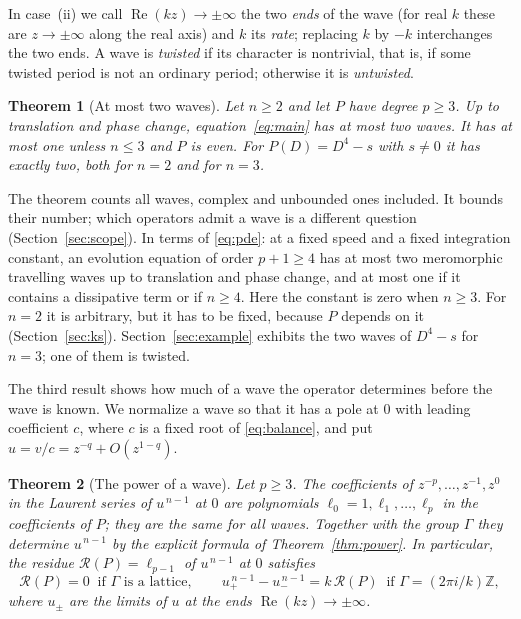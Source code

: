 \documentclass[11pt]{article}
\newtheorem{mainthm}{Theorem}
\theoremstyle{definition}
\theoremstyle{remark}
\numberwithin{equation}{section}
\newcommand{\ZZ}{\mathbb Z}
\begin{document}
In case~(ii) we call \(\operatorname{Re}(kz)\to\pm\infty\) the two
\emph{ends} of the wave (for real \(k\) these are \(z\to\pm\infty\) along
the real axis) and \(k\) its \emph{rate}; replacing \(k\) by \(-k\)
interchanges the two ends. A wave is \emph{twisted} if its character
is nontrivial, that is, if some twisted period is not an ordinary
period; otherwise it is \emph{untwisted}.

\begin{mainthm}[At most two waves]\label{thm:B}
Let \(n\ge2\) and let \(P\) have degree \(p\ge3\). Up to translation
and phase change, equation~\eqref{eq:main} has at most two waves. It
has at most one unless \(n\le3\) and \(P\) is even. For
\(P(D)=D^4-s\) with \(s\ne0\) it has exactly two, both for \(n=2\) and
for \(n=3\).
\end{mainthm}

The theorem counts all waves, complex and unbounded ones included. It
bounds their number; which operators admit a wave is a different
question (Section~\ref{sec:scope}). In terms of \eqref{eq:pde}: at a
fixed speed and a fixed integration constant, an evolution equation of
order \(p+1\ge4\) has at most two meromorphic travelling waves up to
translation and phase change, and at most one if it contains a
dissipative term or if \(n\ge4\). Here the constant is zero when
\(n\ge3\). For \(n=2\) it is arbitrary, but it has to be fixed,
because \(P\) depends on it (Section~\ref{sec:ks}).
Section~\ref{sec:example} exhibits the two waves of \(D^4-s\) for
\(n=3\); one of them is twisted.

The third result shows how much of a wave the operator determines
before the wave is known. We normalize a wave so that it has a pole at
\(0\) with leading coefficient \(c\), where \(c\) is a fixed root of
\eqref{eq:balance}, and put \(u=v/c=z^{-q}+O(z^{1-q})\).

\begin{mainthm}[The power of a wave]\label{thm:C}
Let \(p\ge3\). The coefficients of \(z^{-p},\dots,z^{-1},z^{0}\) in
the Laurent series of \(u^{\,n-1}\) at \(0\) are polynomials
\(\ell_0=1,\ell_1,\dots,\ell_p\) in the coefficients of \(P\); they
are the same for all waves. Together with the group \(\Gamma\) they
determine \(u^{\,n-1}\) by the explicit formula of
Theorem~\ref{thm:power}. In particular, the residue
\(\mathcal R(P)=\ell_{p-1}\) of \(u^{\,n-1}\) at \(0\) satisfies
\[
 \mathcal R(P)=0\ \text{ if \(\Gamma\) is a lattice},\qquad
 u_+^{\,n-1}-u_-^{\,n-1}=k\,\mathcal R(P)\ \text{ if }
 \Gamma=(2\pi i/k)\ZZ,
\]
where \(u_\pm\) are the limits of \(u\) at the ends
\(\operatorname{Re}(kz)\to\pm\infty\).
\end{mainthm}
\end{document}
